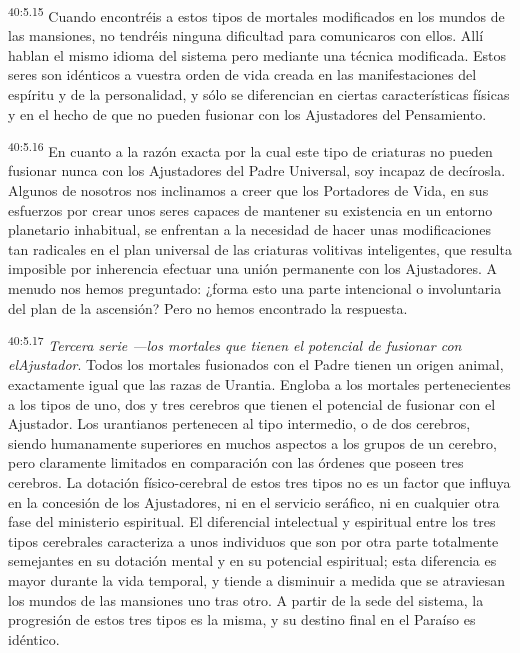 \par
\textsuperscript{40:5.15} Cuando encontréis a estos tipos de mortales modificados en los mundos de las mansiones, no tendréis ninguna dificultad para comunicaros con ellos. Allí hablan el mismo idioma del sistema pero mediante una técnica modificada. Estos seres son idénticos a vuestra orden de vida creada en las manifestaciones del espíritu y de la personalidad, y sólo se diferencian en ciertas características físicas y en el hecho de que no pueden fusionar con los Ajustadores del Pensamiento.

\par
\textsuperscript{40:5.16} En cuanto a la razón exacta por la cual este tipo de criaturas no pueden fusionar nunca con los Ajustadores del Padre Universal, soy incapaz de decírosla. Algunos de nosotros nos inclinamos a creer que los Portadores de Vida, en sus esfuerzos por crear unos seres capaces de mantener su existencia en un entorno planetario inhabitual, se enfrentan a la necesidad de hacer unas modificaciones tan radicales en el plan universal de las criaturas volitivas inteligentes, que resulta imposible por inherencia efectuar una unión permanente con los Ajustadores. A menudo nos hemos preguntado: ¿forma esto una parte intencional o involuntaria del plan de la ascensión? Pero no hemos encontrado la respuesta.

\par
\textsuperscript{40:5.17} \textit{Tercera serie ---los mortales que tienen el potencial de fusionar con elAjustador}. Todos los mortales fusionados con el Padre tienen un origen animal, exactamente igual que las razas de Urantia. Engloba a los mortales pertenecientes a los tipos de uno, dos y tres cerebros que tienen el potencial de fusionar con el Ajustador. Los urantianos pertenecen al tipo intermedio, o de dos cerebros, siendo humanamente superiores en muchos aspectos a los grupos de un cerebro, pero claramente limitados en comparación con las órdenes que poseen tres cerebros. La dotación físico-cerebral de estos tres tipos no es un factor que influya en la concesión de los Ajustadores, ni en el servicio seráfico, ni en cualquier otra fase del ministerio espiritual. El diferencial intelectual y espiritual entre los tres tipos cerebrales caracteriza a unos individuos que son por otra parte totalmente semejantes en su dotación mental y en su potencial espiritual; esta diferencia es mayor durante la vida temporal, y tiende a disminuir a medida que se atraviesan los mundos de las mansiones uno tras otro. A partir de la sede del sistema, la progresión de estos tres tipos es la misma, y su destino final en el Paraíso es idéntico.

